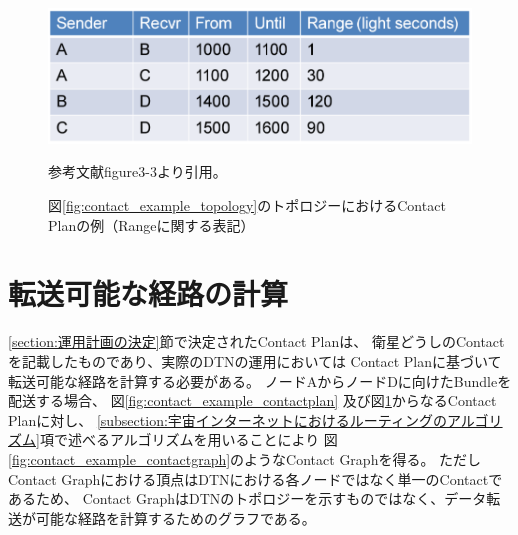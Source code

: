\begin{figure}[tbh]
    \centering
    \includegraphics[width=0.5\textheight]{img/contact_example_contactrange.pdf}
    \caption{図\ref{fig:contact_example_topology}のトポロジーにおけるContact Planの例（Rangeに関する表記）}
    \label{fig:contact_example_contactrange}
    \begin{minipage}{\textwidth}
        \centering
        \vspace{3mm}
        参考文献\cite{schedule_aware_bundle_routing}figure3-3より引用。
    \end{minipage}
\end{figure}


\section{転送可能な経路の計算}
\label{section:経路決定}

\ref{section:運用計画の決定}節で決定されたContact Planは、
衛星どうしのContactを記載したものであり、実際のDTNの運用においては
Contact Planに基づいて転送可能な経路を計算する必要がある。
ノードAからノードDに向けたBundleを配送する場合、
図\ref{fig:contact_example_contactplan}
及び図\ref{fig:contact_example_contactrange}からなるContact Planに対し、
\ref{subsection:宇宙インターネットにおけるルーティングのアルゴリズム}項で述べるアルゴリズムを用いることにより
図\ref{fig:contact_example_contactgraph}のようなContact Graphを得る。
ただしContact Graphにおける頂点はDTNにおける各ノードではなく単一のContactであるため、
Contact GraphはDTNのトポロジーを示すものではなく、データ転送が可能な経路を計算するためのグラフである。

